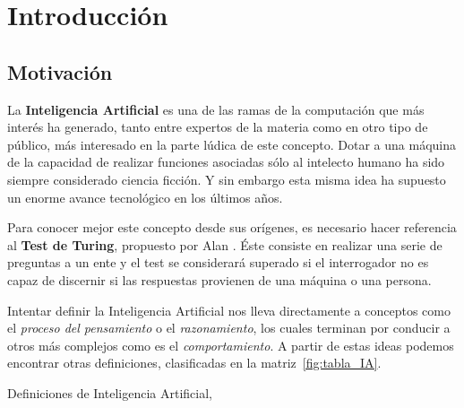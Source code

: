 \chapter{Introducción}
\label{cap:introduccion}



\section{Motivación}

La \textbf{Inteligencia Artificial} es una de las ramas de la computación que más interés ha generado, tanto entre expertos de la materia como en otro tipo de público, más interesado en la parte lúdica de este concepto. Dotar a una máquina de la capacidad de realizar funciones asociadas sólo al intelecto humano ha sido siempre considerado ciencia ficción. Y sin embargo esta misma idea ha supuesto un enorme avance tecnológico en los últimos años.

Para conocer mejor este concepto desde sus orígenes, es necesario hacer referencia al \textbf{Test de Turing}, propuesto por Alan \citet{Turing1950-TURCMA}. Éste consiste en realizar una serie de preguntas a un ente y el test se considerará superado si el interrogador no es capaz de discernir si las respuestas provienen de una máquina o una persona.

Intentar definir la Inteligencia Artificial nos lleva directamente a conceptos como el \textit{proceso del pensamiento} o el \textit{razonamiento}, los cuales terminan por conducir a otros más complejos como es el \textit{comportamiento}. A partir de estas ideas podemos encontrar otras definiciones, clasificadas en la matriz~\ref{fig:tabla_IA}.

%
       {Definiciones de Inteligencia Artificial, \citet{Russell:2009:AIM:1671238}}

